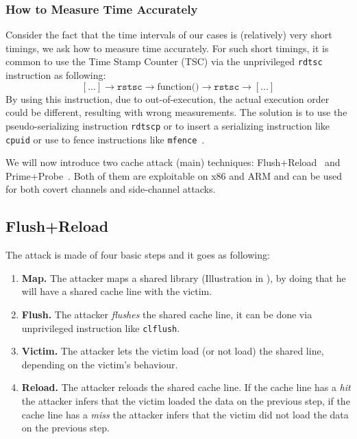 \subsubsection{How to Measure Time Accurately}
\label{subsubsec:howtomeasuretimeaccuractely}
Consider the fact that the time intervals of our cases is (relatively) very short timings, we ask how to measure time accurately. For such short timings, it is common to use the Time Stamp Counter (TSC) via the unprivileged \texttt{rdtsc} instruction as following:
$$[...] \rightarrow \texttt{rstsc} \rightarrow \mbox{function()} \rightarrow \texttt{rstsc} \rightarrow [...]$$
\noindent By using this instruction, due to out-of-execution, the actual execution order could be different, resulting with wrong measurements. The solution is to use the pseudo-serializing instruction \texttt{rdtscp} or to insert a serializing instruction like \texttt{cpuid} or use to fence instructions like \texttt{mfence}~\cite{benchmark2010}.

We will now introduce two cache attack (main) techniques: Flush+Reload~\cite{Gullasch:2011:CGB:2006077.2006784, Osvik:2006:CAC:2117739.2117741, Yarom2014} and Prime+Probe~\cite{Percival2009,Osvik:2006:CAC:2117739.2117741,Liu:2015:LCS:2867539.2867673}. Both of them are exploitable on x86 and ARM and can be used for both covert channels and side-channel attacks.
\subsection{Flush+Reload}
\label{subsec:flushreload}
The attack is made of four basic steps and it goes as following:
\begin{enumerate}
    \item \textbf{Map. } The attacker maps a shared library (Illustration in ), by doing that he will have a shared cache line with the victim.
    \item \textbf{Flush.} The attacker \textit{flushes} the shared cache line, it can be done via unprivileged instruction like \texttt{clflush}.
    \item \textbf{Victim.} The attacker lets the victim load (or not load) the shared line, depending on the victim's behaviour.
    \item \textbf{Reload.} The attacker reloads the shared cache line. If the cache line has a \textit{hit} the attacker infers that the victim loaded the data on the previous step, if the cache line has a \textit{miss} the attacker infers that the victim did not load the data on the previous step.
\end{enumerate}

